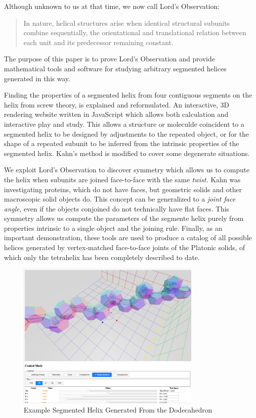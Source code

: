 \documentclass[11pt]{article}
\begin{document}
{Although unknown to us at that time, we now call Lord's Observation:
\begin{quote}
  In nature, helical structures arise when identical structural subunits combine sequentially, the orientational and translational relation between each unit
  and its predecessor remaining constant.\cite{lord2002helical}
\end{quote}
The purpose of this paper is to prove Lord's Observation and provide mathematical tools and software for studying arbitrary
segmented helices generated in this way.

Finding the properties of a segmented helix from four contiguous segments on the helix from screw theory\cite{abbasi2015review,wittenburg2016kinematics,wiki:screwaxis,kahn1989defining},
is explained and reformulated. An interactive, 3D rendering website written in JavaScript which allows both calculation and
interactive play and study. This allows
a structure or moleculde coincident to a segmented helix to be designed
by adjustments to the repeated object, or for the shape of
a repeated subunit to be inferred from the intrinsic properties of the
segmented helix.
Kahn's method \cite{kahn1989defining} is modified to cover some degenerate situations.

We exploit Lord's Observation to discover symmetry which allows us to compute the helix when subunits are joined face-to-face with
the same {\em twist.} Kahn was investigating proteins, which do not have faces, but geometric solids and other macroscopic solid objects do.
This concept can be generalized to a {\em joint face angle}, even if the
objects conjoined do not technically have flat faces.
This symmetry allows us compute the parameters of the segmente helix purely from
properties intrinsic to a single object and the joining rule.
Finally, as an important demonstration, these tools are used to produce
a catalog of all possible helices generated by vertex-matched face-to-face joints of the
Platonic solids, of which only the tetrahelix\cite{coxeter1985simplicial,sadler2013periodic,fuller1982synergetics,read2018transforming,pearce1990structure}
has been completely described to date.

\begin{figure}
     \centering
     \includegraphics[width=0.80\textwidth]{figures/Dodecahedral.png}
     \caption{Example Segmented Helix Generated From the Dodecahedron}
  \label{fig:dodecahedron}
\end{figure}


}
\end{document}
